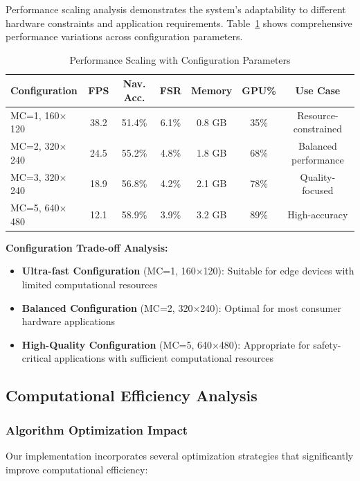 \documentclass[10pt]{article}
\newcommand{\tabref}[1]{Table~\ref{#1}}
\begin{document}
Performance scaling analysis demonstrates the system's adaptability to different hardware constraints and application requirements. \tabref{tab:performance_scaling_detailed} shows comprehensive performance variations across configuration parameters.

\begin{table}[ht]
\centering
\caption{Performance Scaling with Configuration Parameters}
\label{tab:performance_scaling_detailed}
\begin{tabular}{@{}lcccccc@{}}
\toprule
\textbf{Configuration} & \textbf{FPS} & \textbf{Nav. Acc.} & \textbf{FSR} & \textbf{Memory} & \textbf{GPU\%} & \textbf{Use Case} \\
\midrule
MC=1, 160$\times$120 & 38.2 & 51.4\% & 6.1\% & 0.8 GB & 35\% & Resource-constrained \\
MC=2, 320$\times$240 & 24.5 & 55.2\% & 4.8\% & 1.8 GB & 68\% & Balanced performance \\
MC=3, 320$\times$240 & 18.9 & 56.8\% & 4.2\% & 2.1 GB & 78\% & Quality-focused \\
MC=5, 640$\times$480 & 12.1 & 58.9\% & 3.9\% & 3.2 GB & 89\% & High-accuracy \\
\bottomrule
\end{tabular}
\end{table}

\textbf{Configuration Trade-off Analysis:}
\begin{itemize}
\item \textbf{Ultra-fast Configuration} (MC=1, 160$\times$120): Suitable for edge devices with limited computational resources
\item \textbf{Balanced Configuration} (MC=2, 320$\times$240): Optimal for most consumer hardware applications
\item \textbf{High-Quality Configuration} (MC=5, 640$\times$480): Appropriate for safety-critical applications with sufficient computational resources
\end{itemize}

\subsection{Computational Efficiency Analysis}

\subsubsection{Algorithm Optimization Impact}

Our implementation incorporates several optimization strategies that significantly improve computational efficiency:
\end{document}
